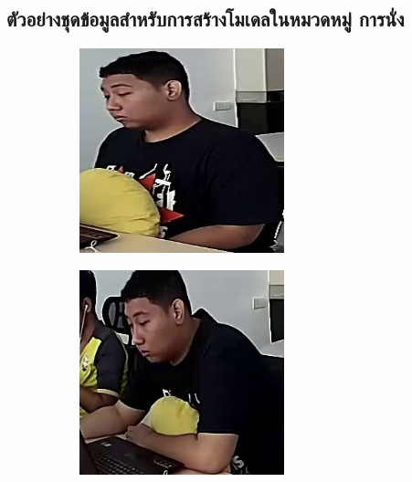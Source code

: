 \clearpage
\subsection*{ตัวอย่างชุดข้อมูลสำหรับการสร้างโมเดลในหมวดหมู่ การนั่ง }
\begin{figure}[!ht]
    \centering
   \begin{subfigure}[b]{0.45\linewidth}
      \includegraphics[width=\linewidth]{appendix/sit/000_CXS0_D0_003661.jpg}
    \end{subfigure}
    \begin{subfigure}[b]{0.45\linewidth}
      \includegraphics[width=\linewidth]{appendix/sit/000_CXS0_D0_006682.jpg}

\end{subfigure}
\end{figure}
